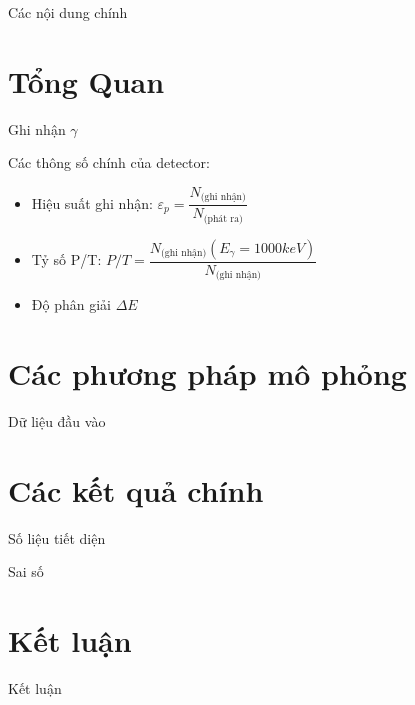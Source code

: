 \documentclass[11pt]{beamer}
\begin{document}
\begin{frame}
\titlepage
\end{frame}

\begin{frame}{Các nội dung chính}
\tableofcontents
\end{frame}

\section{Tổng Quan}



\begin{frame}[label = ghinhan]{Ghi nhận $\gamma$}

Các thông số chính của detector:

\begin{itemize}

\item<2-> Hiệu suất ghi nhận: $\varepsilon_{p} = \dfrac{N_\text{(ghi nhận)}}{N_\text{(phát ra)}}$

\item<3-> Tỷ số P/T: $P/T = \dfrac{N_\text{(ghi nhận)}(E_{\gamma} = 1000 keV)}{N_\text{(ghi nhận)}}$

\item<4-> Độ phân giải $\Delta E$

\end{itemize}


\end{frame}











%
%

\section{Các phương pháp mô phỏng}
\begin{frame}{Dữ liệu đầu vào}
\end{frame}


\section{Các kết quả chính}
\begin{frame}{Số liệu tiết diện}
\end{frame}

\begin{frame}{Sai số}
\end{frame}

\section{Kết luận}
\begin{frame}{Kết luận}
\end{frame}
\end{document}
